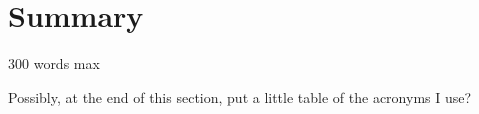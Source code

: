
\chapter*{Summary}

300 words max

Possibly, at the end of this section, put a little table of the acronyms I use?